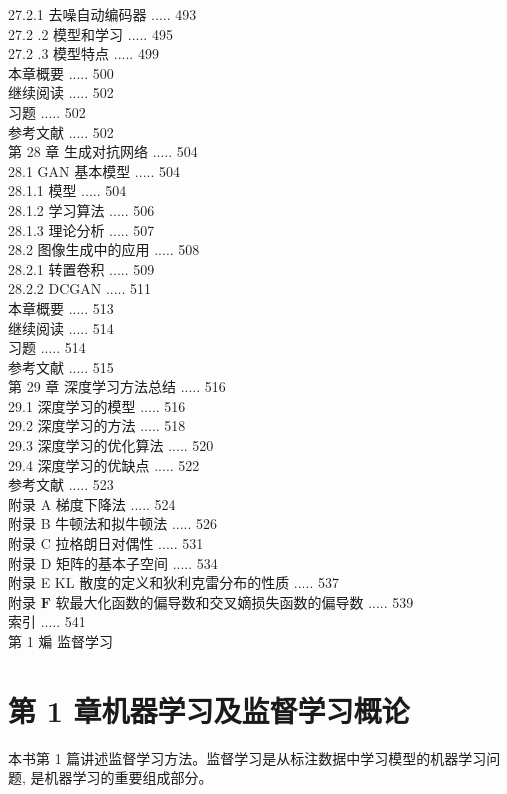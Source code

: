 \documentclass[10pt]{article}
\begin{document}
\begin{CJK*}{UTF8}{bsmi}
27.2.1 去噪自动编码器 ..... 493\\
27.2 .2 模型和学习 ..... 495\\
27.2 .3 模型特点 ..... 499\\
本章概要 ..... 500\\
继续阅读 ..... 502\\
习题 ..... 502\\
参考文献 ..... 502\\
第 28 章 生成对抗网络 ..... 504\\
28.1 GAN 基本模型 ..... 504\\
28.1.1 模型 ..... 504\\
28.1.2 学习算法 ..... 506\\
28.1.3 理论分析 ..... 507\\
28.2 图像生成中的应用 ..... 508\\
28.2.1 转置卷积 ..... 509\\
28.2.2 DCGAN ..... 511\\
本章概要 ..... 513\\
继续阅读 ..... 514\\
习题 ..... 514\\
参考文献 ..... 515\\
第 29 章 深度学习方法总结 ..... 516\\
29.1 深度学习的模型 ..... 516\\
29.2 深度学习的方法 ..... 518\\
29.3 深度学习的优化算法 ..... 520\\
29.4 深度学习的优缺点 ..... 522\\
参考文献 ..... 523\\
附录 A 梯度下降法 ..... 524\\
附录 B 牛顿法和拟牛顿法 ..... 526\\
附录 C 拉格朗日对偶性 ..... 531\\
附录 D 矩阵的基本子空间 ..... 534\\
附录 E KL 散度的定义和狄利克雷分布的性质 ..... 537\\
附录 $\mathbf{F}$ 软最大化函数的偏导数和交叉嫡损失函数的偏导数 ..... 539\\
索引 ..... 541\\
第 1 斒 监督学习

\section*{第 1 章机器学习及监督学习概论}
本书第 1 篇讲述监督学习方法。监督学习是从标注数据中学习模型的机器学习问题, 是机器学习的重要组成部分。


\end{CJK*}
\end{document}
